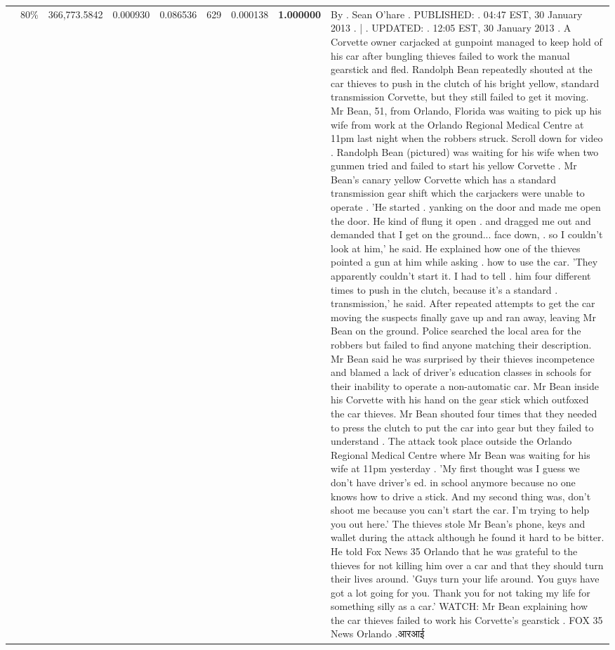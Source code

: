 \begin{table}[H]
\begin{tabular}{llrrrrrrl}
 & 80\% & 366,773.5842 & 0.000930 & 0.086536 & \color{red} 629 & 0.000138 & \bfseries \color{red} 1.000000 & By . Sean O'hare . PUBLISHED: . 04:47 EST, 30 January 2013 . | . UPDATED: . 12:05 EST, 30 January 2013 . A Corvette owner carjacked at gunpoint managed to keep hold of his car after bungling thieves failed to work the manual gearstick and fled. Randolph Bean repeatedly shouted at the car thieves to push in the clutch of his bright yellow, standard transmission Corvette, but they still failed to get it moving. Mr Bean, 51, from Orlando, Florida was waiting to pick up his wife from work at the Orlando Regional Medical Centre at 11pm last night when the robbers struck. Scroll down for video . Randolph Bean (pictured) was waiting for his wife when two gunmen tried and failed to start his yellow Corvette . Mr Bean's canary yellow Corvette which has a standard transmission gear shift which the carjackers were unable to operate . 'He started . yanking on the door and made me open the door. He kind of flung it open . and dragged me out and demanded that I get on the ground... face down, . so I couldn't look at him,' he said. He explained how one of the thieves pointed a gun at him while asking . how to use the car. 'They apparently couldn't start it. I had to tell . him four different times to push in the clutch, because it's a standard . transmission,' he said. After repeated attempts to get the car moving the suspects finally gave up and ran away, leaving Mr Bean on the ground. Police searched the local area for the robbers but failed to find anyone matching their description. Mr Bean said he was surprised by their thieves incompetence and blamed a lack of driver's education classes in schools for their inability to operate a non-automatic car. Mr Bean inside his Corvette with his hand on the gear stick which outfoxed the car thieves. Mr Bean shouted four times that they needed to press the clutch to put the car into gear but they failed to understand . The attack took place outside the Orlando Regional Medical Centre where Mr Bean was waiting for his wife at 11pm yesterday . 'My first thought was I guess we don't have driver's ed. in school anymore because no one knows how to drive a stick. And my second thing was, don't shoot me because you can't start the car. I'm trying to help you out here.' The thieves stole Mr Bean's phone, keys and wallet during the attack although he found it hard to be bitter. He told Fox News 35 Orlando that he was grateful to the thieves for not killing him over a car and that they should turn their lives around. 'Guys turn your life around. You guys have got a lot going for you. Thank you for not taking my life for something silly as a car.' WATCH: Mr Bean explaining how the car thieves failed to work his Corvette's gearstick . FOX 35 News Orlando .आरआई \\

\end{tabular}
\end{table}
